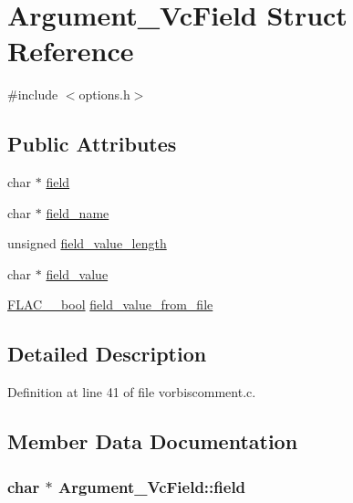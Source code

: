 \hypertarget{struct_argument___vc_field}{}\section{Argument\+\_\+\+Vc\+Field Struct Reference}
\label{struct_argument___vc_field}


{\ttfamily \#include $<$options.\+h$>$}

\subsection*{Public Attributes}
\begin{DoxyCompactItemize}
\item 
char $\ast$ \hyperlink{struct_argument___vc_field_a8bc4ee95a1193044d5caa23ffba77cb2}{field}
\item 
char $\ast$ \hyperlink{struct_argument___vc_field_a7675074874926164d81fde4b17932172}{field\+\_\+name}
\item 
unsigned \hyperlink{struct_argument___vc_field_ad062c64c6b87e6dabe6994184d11e69c}{field\+\_\+value\+\_\+length}
\item 
char $\ast$ \hyperlink{struct_argument___vc_field_ace3aa786762da18fc086b6a877273d23}{field\+\_\+value}
\item 
\hyperlink{ordinals_8h_a95103469f1cbd78b8cf250194985b34e}{F\+L\+A\+C\+\_\+\+\_\+bool} \hyperlink{struct_argument___vc_field_a7dc1db175ddf4ebd8ef6560b00285842}{field\+\_\+value\+\_\+from\+\_\+file}
\end{DoxyCompactItemize}


\subsection{Detailed Description}


Definition at line 41 of file vorbiscomment.\+c.



\subsection{Member Data Documentation}
\subsubsection[{\texorpdfstring{field}{field}}]{\setlength{\rightskip}{0pt plus 5cm}char $\ast$ Argument\+\_\+\+Vc\+Field\+::field}\hypertarget{struct_argument___vc_field_a8bc4ee95a1193044d5caa23ffba77cb2}{}\label{struct_argument___vc_field_a8bc4ee95a1193044d5caa23ffba77cb2}


